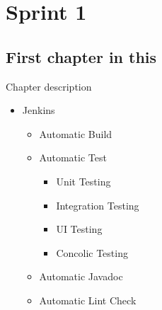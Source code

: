 \part{Sprint 1}

\chapter{First chapter in this}%
Chapter description

\begin{itemize}
  \item Jenkins
  \begin{itemize}
    \item Automatic Build
    \item Automatic Test
    \begin{itemize}
      \item Unit Testing
      \item Integration Testing
      \item UI Testing
      \item Concolic Testing
    \end{itemize}
    \item Automatic Javadoc
    \item Automatic Lint Check
  \end{itemize}
\end{itemize}

%